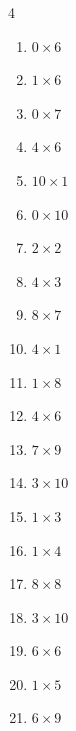 \begin{multicols}{4}
\begin{enumerate}
  \item $0\times 6$
        \phantom{$=0$}

  \item $1\times 6$
        \phantom{$=6$}

  \item $0\times 7$
        \phantom{$=0$}

  \item $4\times 6$
        \phantom{$=24$}

  \item $10\times 1$
        \phantom{$=10$}

  \item $0\times 10$
        \phantom{$=0$}

  \item $2\times 2$
        \phantom{$=4$}

  \item $4\times 3$
        \phantom{$=12$}

  \item $8\times 7$
        \phantom{$=56$}

  \item $4\times 1$
        \phantom{$=4$}

  \item $1\times 8$
        \phantom{$=8$}

  \item $4\times 6$
        \phantom{$=24$}

  \item $7\times 9$
        \phantom{$=63$}

  \item $3\times 10$
        \phantom{$=30$}

  \item $1\times 3$
        \phantom{$=3$}

  \item $1\times 4$
        \phantom{$=4$}

  \item $8\times 8$
        \phantom{$=64$}

  \item $3\times 10$
        \phantom{$=30$}

  \item $6\times 6$
        \phantom{$=36$}

  \item $1\times 5$
        \phantom{$=5$}

  \item $6\times 9$
        \phantom{$=54$}


\end{enumerate}
\end{multicols}
